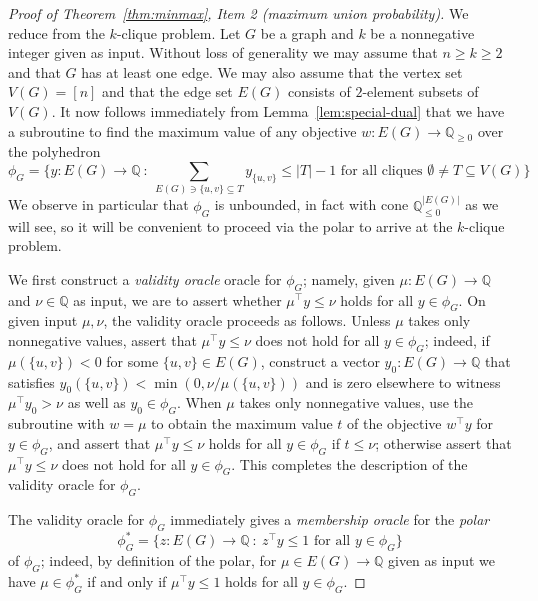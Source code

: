 \documentclass[11pt]{article}
\begin{document}
\begin{proof}[Proof of Theorem~\ref{thm:minmax}, Item 2 (maximum union probability)]

We reduce from the $k$-clique problem. Let $G$ be a graph and $k$ be 
a nonnegative integer given as input. Without loss of generality we may
assume that $n\geq k\geq 2$ and that $G$ has at least one edge.
We may also assume that the vertex set $V(G)=[n]$ and that the edge
set $E(G)$ consists of $2$-element subsets of $V(G)$. 
It now follows immediately from Lemma~\ref{lem:special-dual} that
we have a subroutine to find the maximum value of any
objective $w:E(G)\rightarrow \mathbb{Q}_{\geq 0}$ over the polyhedron 
\begin{equation}
\label{eq:phi-polyhedron}
\phi_G=\biggl\{y:E(G)\rightarrow\mathbb{Q}\ :\ 
\text{$\sum_{E(G)\ni \{u,v\}\subseteq T}y_{\{u,v\}}\leq |T|-1$ 
for all  cliques $\emptyset \neq T\subseteq V(G)$}\biggr\}\,
\end{equation}
We observe in particular that $\phi_G$ is unbounded, in fact with cone
$\mathbb{Q}^{|E(G)|}_{\leq 0}$ as we will see, so it will be convenient
to proceed via the polar to arrive at the $k$-clique problem.

We first construct a {\em validity oracle} oracle for 
$\phi_G$; 
namely, given $\mu:E(G)\rightarrow\mathbb{Q}$ and $\nu\in\mathbb{Q}$
as input, we are to assert whether $\mu^\top y\leq \nu$ holds 
for all $y\in\phi_G$. On given input $\mu,\nu$, the validity oracle proceeds
as follows. Unless $\mu$ takes only nonnegative values, assert that
$\mu^\top y\leq \nu$ does not hold for all $y\in\phi_G$; indeed,
if $\mu(\{u,v\})<0$ for some $\{u,v\}\in E(G)$, construct 
a vector $y_0:E(G)\rightarrow\mathbb{Q}$ that 
satisfies $y_0(\{u,v\})<\min(0,\nu/\mu(\{u,v\}))$ and is zero elsewhere 
to witness $\mu^\top y_0>\nu$ as well as $y_0\in\phi_G$.
When $\mu$ takes only nonnegative values, use the subroutine with 
$w=\mu$ to obtain the maximum value $t$ of the objective $w^\top y$ 
for $y\in\phi_G$, and assert that $\mu^\top y\leq \nu$ holds 
for all $y\in\phi_G$ if $t\leq \nu$; otherwise assert that 
$\mu^\top y\leq \nu$ does not hold for all $y\in\phi_G$.
This completes the description of the validity oracle for $\phi_G$.

The validity oracle for $\phi_G$ immediately gives a {\em membership oracle} 
for the {\em polar}
\begin{equation}
\label{eq:polar}
\phi_G^*=\biggl\{z:E(G)\rightarrow\mathbb{Q}\ :\ \text{$z^\top y\leq 1$ for all $y\in\phi_G$}\biggr\}
\end{equation}
of $\phi_G$; indeed, by definition of the polar, 
for $\mu\in E(G)\rightarrow\mathbb{Q}$ given as input we have 
$\mu\in\phi_G^*$ if and only if $\mu^\top y\leq 1$ holds for all $y\in\phi_G$.


\end{proof}
\end{document}
